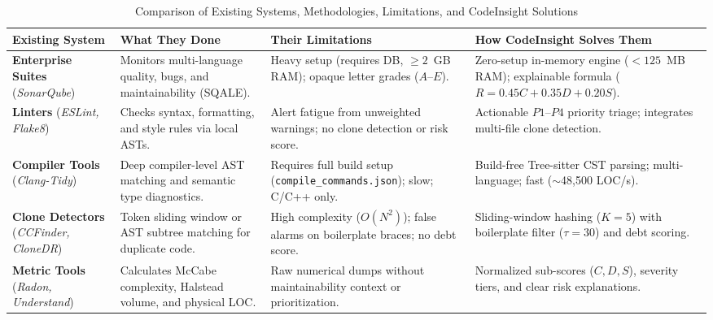 \begin{table}[htbp]
\centering
\scriptsize
\caption{Comparison of Existing Systems, Methodologies, Limitations, and CodeInsight Solutions}
\label{tab:comparison_systems}
\vspace{0.2cm}
\renewcommand{\arraystretch}{1.25}
\begin{tabularx}{\textwidth}{@{}p{2.4cm}p{3.2cm}p{4.2cm}>{\raggedright\arraybackslash}X@{}}
\toprule
\textbf{Existing System} & \textbf{What They Done} & \textbf{Their Limitations} & \textbf{How CodeInsight Solves Them} \\
\midrule
\textbf{Enterprise Suites} \newline (\textit{SonarQube}) &
Monitors multi-language quality, bugs, and maintainability (SQALE). &
Heavy setup (requires DB, $\ge 2$~GB RAM); opaque letter grades ($A$--$E$). &
Zero-setup in-memory engine ($<125$~MB RAM); explainable formula ($R = 0.45C + 0.35D + 0.20S$). \\
\addlinespace
\textbf{Linters} \newline (\textit{ESLint, Flake8}) &
Checks syntax, formatting, and style rules via local ASTs. &
Alert fatigue from unweighted warnings; no clone detection or risk score. &
Actionable $P1$--$P4$ priority triage; integrates multi-file clone detection. \\
\addlinespace
\textbf{Compiler Tools} \newline (\textit{Clang-Tidy}) &
Deep compiler-level AST matching and semantic type diagnostics. &
Requires full build setup (\texttt{compile\_commands.json}); slow; C/C++ only. &
Build-free Tree-sitter CST parsing; multi-language; fast ($\sim$48,500 LOC/s). \\
\addlinespace
\textbf{Clone Detectors} \newline (\textit{CCFinder, CloneDR}) &
Token sliding window or AST subtree matching for duplicate code. &
High complexity ($O(N^2)$); false alarms on boilerplate braces; no debt score. &
Sliding-window hashing ($K=5$) with boilerplate filter ($\tau=30$) and debt scoring. \\
\addlinespace
\textbf{Metric Tools} \newline (\textit{Radon, Understand}) &
Calculates McCabe complexity, Halstead volume, and physical LOC. &
Raw numerical dumps without maintainability context or prioritization. &
Normalized sub-scores ($C,D,S$), severity tiers, and clear risk explanations. \\
\bottomrule
\end{tabularx}
\end{table}

